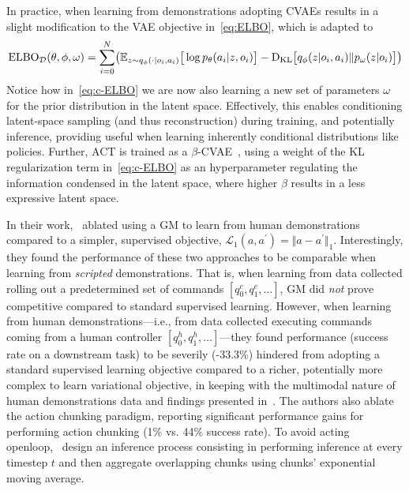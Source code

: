 In practice, when learning from demonstrations adopting CVAEs results in a slight modification to the VAE objective in~\ref{eq:ELBO}, which is adapted to
\begin{align}\label{eq:c-ELBO}
    \text{ELBO}_{\mathcal D}(\theta, \phi, \omega) = \sum_{i=0}^{N} \left(
            \mathbb{E}_{z \sim q_\phi(\cdot \vert o_i, a_i)} \big[ \log p_\theta(a_i \vert z, o_i) \big]
        - \DKL \big[ q_\phi(z \vert o_i, a_i) \Vert p_\omega(z \vert o_i) \big]
        \right)
\end{align}
Notice how in~\ref{eq:c-ELBO} we are now also learning a new set of parameters \( \omega \) for the prior distribution in the latent space.
Effectively, this enables conditioning latent-space sampling (and thus reconstruction) during training, and potentially inference, providing useful when learning inherently conditional distributions like policies.
Further, ACT is trained as a \( \beta\)-CVAE~\citep{higgins2017beta}, using a weight of the KL regularization term in~\ref{eq:c-ELBO} as an hyperparameter regulating the information condensed in the latent space, where higher \( \beta \) results in a less expressive latent space.

In their work,~\citet{zhaoLearningFineGrainedBimanual2023} ablated using a GM to learn from human demonstrations compared to a simpler, supervised objective, \( \mathcal L_1(a,a^\prime) = \Vert a - a^\prime \Vert_1 \).
Interestingly, they found the performance of these two approaches to be comparable when learning from \emph{scripted} demonstrations.
That is, when learning from data collected rolling out a predetermined set of commands \( [q^c_0, q^c_1, \dots] \), GM did \emph{not} prove competitive compared to standard supervised learning.
However, when learning from human demonstrations---i.e., from data collected executing commands coming from a human controller \( [q^h_0, q^h_1, \dots] \)---they found performance (success rate on a downstream task) to be severily (-33.3\%) hindered from adopting a standard supervised learning objective compared to a richer, potentially more complex to learn variational objective, in keeping with the multimodal nature of human demonstrations data and findings presented in~\citet{florenceImplicitBehavioralCloning2022}.
The authors also ablate the action chunking paradigm, reporting significant performance gains for performing action chunking (1\% vs. 44\% success rate).
To avoid acting openloop,~\citet{zhaoLearningFineGrainedBimanual2023} design an inference process consisting in performing inference at every timestep \( t \) and then aggregate overlapping chunks using chunks' exponential moving average.  

